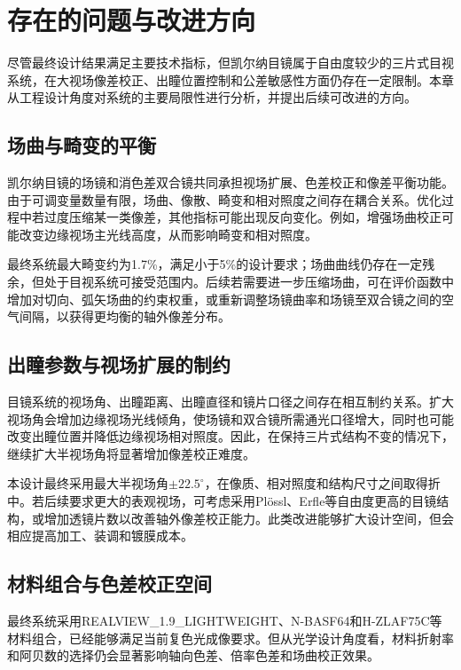 \section{存在的问题与改进方向}

尽管最终设计结果满足主要技术指标，但凯尔纳目镜属于自由度较少的三片式目视系统，在大视场像差校正、出瞳位置控制和公差敏感性方面仍存在一定限制。本章从工程设计角度对系统的主要局限性进行分析，并提出后续可改进的方向。

\subsection{场曲与畸变的平衡}

凯尔纳目镜的场镜和消色差双合镜共同承担视场扩展、色差校正和像差平衡功能。由于可调变量数量有限，场曲、像散、畸变和相对照度之间存在耦合关系。优化过程中若过度压缩某一类像差，其他指标可能出现反向变化。例如，增强场曲校正可能改变边缘视场主光线高度，从而影响畸变和相对照度。

最终系统最大畸变约为1.7\%，满足小于5\%的设计要求；场曲曲线仍存在一定残余，但处于目视系统可接受范围内。后续若需要进一步压缩场曲，可在评价函数中增加对切向、弧矢场曲的约束权重，或重新调整场镜曲率和场镜至双合镜之间的空气间隔，以获得更均衡的轴外像差分布。

\subsection{出瞳参数与视场扩展的制约}

目镜系统的视场角、出瞳距离、出瞳直径和镜片口径之间存在相互制约关系。扩大视场角会增加边缘视场光线倾角，使场镜和双合镜所需通光口径增大，同时也可能改变出瞳位置并降低边缘视场相对照度。因此，在保持三片式结构不变的情况下，继续扩大半视场角将显著增加像差校正难度。

本设计最终采用最大半视场角\(\pm 22.5^\circ\)，在像质、相对照度和结构尺寸之间取得折中。若后续要求更大的表观视场，可考虑采用Plössl、Erfle等自由度更高的目镜结构，或增加透镜片数以改善轴外像差校正能力。此类改进能够扩大设计空间，但会相应提高加工、装调和镀膜成本。

\subsection{材料组合与色差校正空间}

最终系统采用REALVIEW\_1.9\_LIGHTWEIGHT、N-BASF64和H-ZLAF75C等材料组合，已经能够满足当前复色光成像要求。但从光学设计角度看，材料折射率和阿贝数的选择仍会显著影响轴向色差、倍率色差和场曲校正效果。

